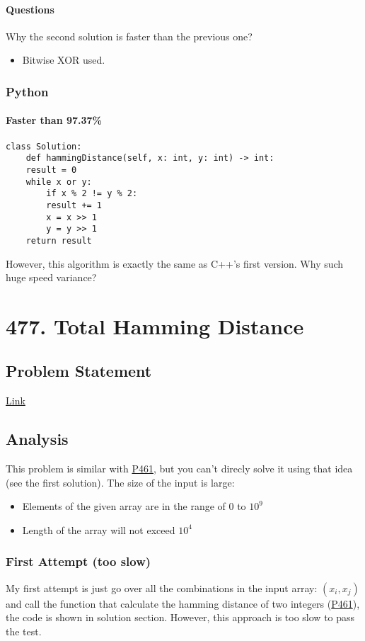 \documentclass[12pt]{article}
\begin{document}
\paragraph{Questions}
\label{sec:org951e9ee}
Why the second solution is faster than the previous one?
\begin{itemize}
\item Bitwise XOR used.
\end{itemize}
\subsubsection{Python}
\label{sec:orgb5675b1}
\paragraph{Faster than 97.37\%}
\label{sec:org0e40e4d}
\begin{verbatim}
class Solution:
    def hammingDistance(self, x: int, y: int) -> int:
	result = 0
	while x or y:
	    if x % 2 != y % 2:
		result += 1
	    x = x >> 1
	    y = y >> 1
	return result
\end{verbatim}
However, this algorithm is exactly the same as C++'s first version. Why such huge speed variance?
\section{477. Total Hamming Distance}
\label{sec:orgf16c087}
\subsection{Problem Statement}
\label{sec:org22d8df6}
\href{https://leetcode.com/problems/total-hamming-distance/}{Link}
\subsection{Analysis}
\label{sec:orgdbaac2c}
This problem is similar with \hyperref[org1510eda]{P461}, but you can't direcly solve it using that idea (see the first solution). The size of the input is large:
\begin{itemize}
\item Elements of the given array are in the range of \(0\) to \(10^9\)
\item Length of the array will not exceed \(10^4\)
\end{itemize}

\subsubsection{First Attempt (too slow)}
\label{sec:org43e092f}
My first attempt is just go over all the combinations in the input array: \((x_i, x_j)\) and call the function that calculate the hamming distance of two integers (\hyperref[org1510eda]{P461}), the code is shown in solution section. However, this approach is too slow to pass the test.
\end{document}
